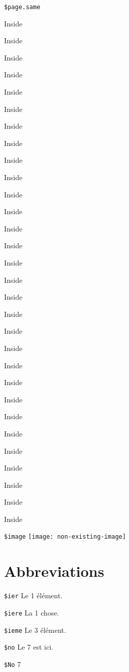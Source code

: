 \documentclass[demo]{pyscribe}
\begin{document}
\texttt{\$page.same} \begin{samepage}
Inside \par Inside \par Inside \par Inside \par Inside \par Inside \par Inside \par Inside \par Inside \par Inside \par Inside \par Inside \par Inside \par Inside \par Inside \par Inside \par Inside \par Inside \par Inside \par Inside \par Inside \par Inside \par Inside \par Inside \par Inside \par Inside \par Inside \par Inside \par Inside \par Inside \par
\end{samepage}

\par\medskip
\texttt{\$image} \ifx\pdfoutput\undefined\else
\texttt{[image: non-existing-image]}


\section{Abbreviations}

\par\medskip
\texttt{\$ier} Le 1\ier{} élément.
\par\medskip
\texttt{\$iere} La 1\iere{} chose.
\par\medskip
\texttt{\$ieme} Le 3\ieme{} élément.
\par\medskip
\texttt{\$no} Le \no{}7 est ici.
\par\medskip
\texttt{\$No} \no{}7
\end{document}
